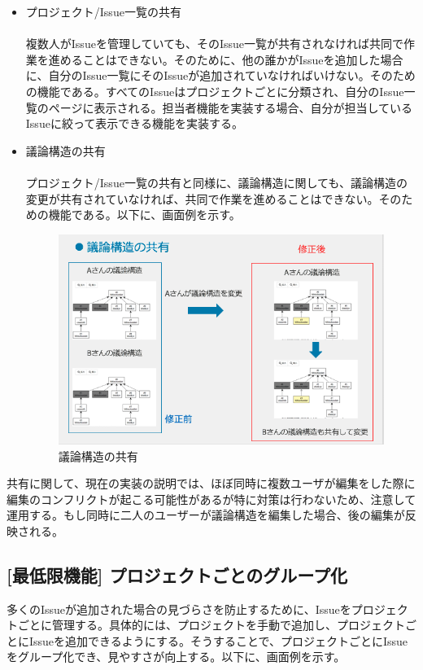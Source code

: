 \documentclass[12pt, oneside]{jreport}
\begin{document}
\begin{itemize}
			\item プロジェクト/Issue一覧の共有
			\\ \\
			複数人がIssueを管理していても、そのIssue一覧が共有されなければ共同で作業を進めることはできない。そのために、他の誰かがIssueを追加した場合に、自分のIssue一覧にそのIssueが追加されていなければいけない。そのための機能である。すべてのIssueはプロジェクトごとに分類され、自分のIssue一覧のページに表示される。担当者機能を実装する場合、自分が担当しているIssueに絞って表示できる機能を実装する。
			

		
			\item 議論構造の共有
			\\ \\
			プロジェクト/Issue一覧の共有と同様に、議論構造に関しても、議論構造の変更が共有されていなければ、共同で作業を進めることはできない。そのための機能である。以下に、画面例を示す。
			
			\begin{figure}[H]
			\centering
			\includegraphics[width=17cm,bb=200 300 -200 27]{GraphShare.png}
			\caption{議論構造の共有}
			\end{figure}
			
		\end{itemize}
		
		共有に関して、現在の実装の説明では、ほぼ同時に複数ユーザが編集をした際に編集のコンフリクトが起こる可能性があるが特に対策は行わないため、注意して運用する。もし同時に二人のユーザーが議論構造を編集した場合、後の編集が反映される。
		
		\subsection{[最低限機能] プロジェクトごとのグループ化}
		多くのIssueが追加された場合の見づらさを防止するために、Issueをプロジェクトごとに管理する。具体的には、プロジェクトを手動で追加し、プロジェクトごとにIssueを追加できるようにする。そうすることで、プロジェクトごとにIssueをグループ化でき、見やすさが向上する。以下に、画面例を示す。
		
\end{document}
